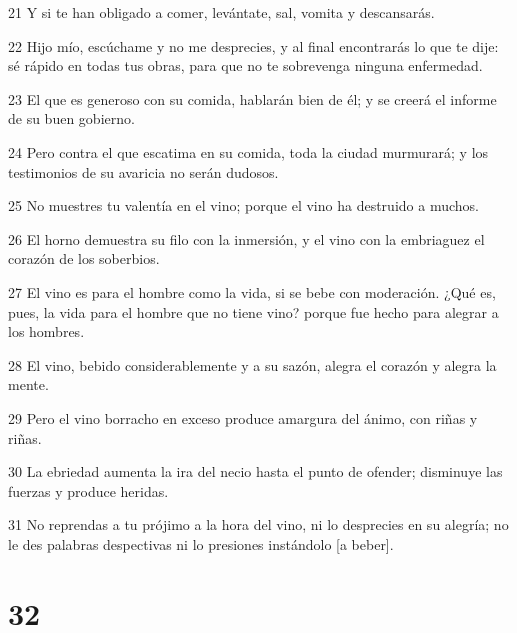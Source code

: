 \par 21 Y si te han obligado a comer, levántate, sal, vomita y descansarás.
\par 22 Hijo mío, escúchame y no me desprecies, y al final encontrarás lo que te dije: sé rápido en todas tus obras, para que no te sobrevenga ninguna enfermedad.
\par 23 El que es generoso con su comida, hablarán bien de él; y se creerá el informe de su buen gobierno.
\par 24 Pero contra el que escatima en su comida, toda la ciudad murmurará; y los testimonios de su avaricia no serán dudosos.
\par 25 No muestres tu valentía en el vino; porque el vino ha destruido a muchos.
\par 26 El horno demuestra su filo con la inmersión, y el vino con la embriaguez el corazón de los soberbios.
\par 27 El vino es para el hombre como la vida, si se bebe con moderación. ¿Qué es, pues, la vida para el hombre que no tiene vino? porque fue hecho para alegrar a los hombres.
\par 28 El vino, bebido considerablemente y a su sazón, alegra el corazón y alegra la mente.
\par 29 Pero el vino borracho en exceso produce amargura del ánimo, con riñas y riñas.
\par 30 La ebriedad aumenta la ira del necio hasta el punto de ofender; disminuye las fuerzas y produce heridas.
\par 31 No reprendas a tu prójimo a la hora del vino, ni lo desprecies en su alegría; no le des palabras despectivas ni lo presiones instándolo [a beber].

\chapter{32}

